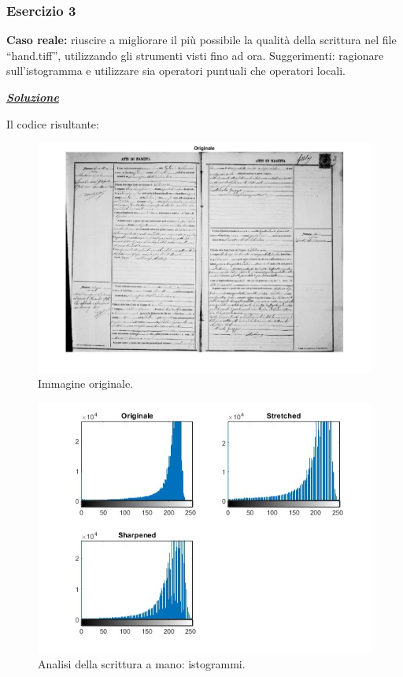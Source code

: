\documentclass[a4paper]{article}
\newcommand{\dquotes}[1]{``#1''}
\begin{document}
	\subsubsection{Esercizio 3}
	
	\textbf{Caso reale:} riuscire a migliorare il più possibile la qualità della scrittura nel file \dquotes{\textsf{hand.tiff}}, utilizzando gli strumenti visti fino ad ora. Suggerimenti: ragionare sull'istogramma e utilizzare sia operatori puntuali che operatori locali.\newline
	
	\noindent
	\textcolor{Green4}{\textbf{\emph{\underline{Soluzione}}}}\newline
	
	\noindent
	Il codice risultante:
	\newpage
	
	\begin{figure}[!htp]
		\centering
		\includegraphics[width=\textwidth]{img/lab/operato-locali-12.jpg}
		\caption{Immagine originale.}
	\end{figure}
	\begin{figure}[!htp]
		\centering
		\includegraphics[width=\textwidth]{img/lab/operato-locali-13.jpg}
		\caption{Analisi della scrittura a mano: istogrammi.}
	\end{figure}\newpage
	
\end{document}
